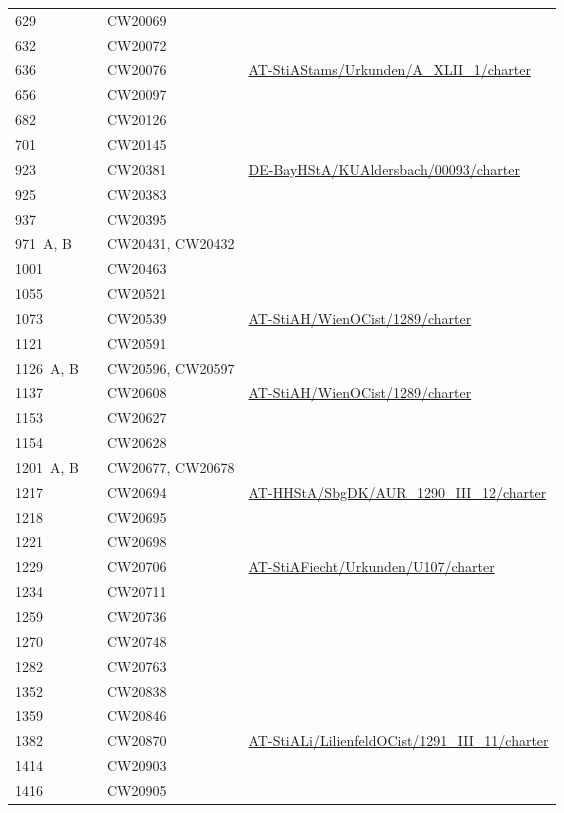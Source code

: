 \begin{xltabular}{\linewidth}{@{} l c l X @{}}
629		&           & CW20069 \\
632		&           & CW20072 \\
636		&           & CW20076
		& \url{AT-StiAStams/Urkunden/A_XLII_1/charter}
	\\
656		&           & CW20097 \\
682		&           & CW20126 \\
701		&           & CW20145 \\
923		&           & CW20381
		& \url{DE-BayHStA/KUAldersbach/00093/charter}
	\\
925		&           & CW20383 \\
937		&           & CW20395 \\
971~A, B	&           & CW20431, CW20432 \\
1001	&           & CW20463 \\
1055	&           & CW20521 \\
1073	&           & CW20539
		& \url{AT-StiAH/WienOCist/1289/charter}
	\\
1121	&           & CW20591 \\
1126~A, B	&           & CW20596, CW20597 \\
1137	&           & CW20608
		& \url{AT-StiAH/WienOCist/1289/charter}
	\\
1153	&           & CW20627 \\
1154	&           & CW20628 \\
1201~A, B	&           & CW20677, CW20678 \\
1217	&           & CW20694
		& \url{AT-HHStA/SbgDK/AUR_1290_III_12/charter}
	\\
1218	&           & CW20695 \\
1221	&           & CW20698 \\
1229	&           & CW20706
		& \url{AT-StiAFiecht/Urkunden/U107/charter}
	\\
1234	&           & CW20711 \\
1259	&           & CW20736 \\
1270	&           & CW20748 \\
1282	&           & CW20763 \\
1352	&           & CW20838 \\
1359	&           & CW20846 \\
1382	&           & CW20870
		& \url{AT-StiALi/LilienfeldOCist/1291_III_11/charter}
	\\
1414	&           & CW20903 \\
1416	&           & CW20905 \\

\end{xltabular}
